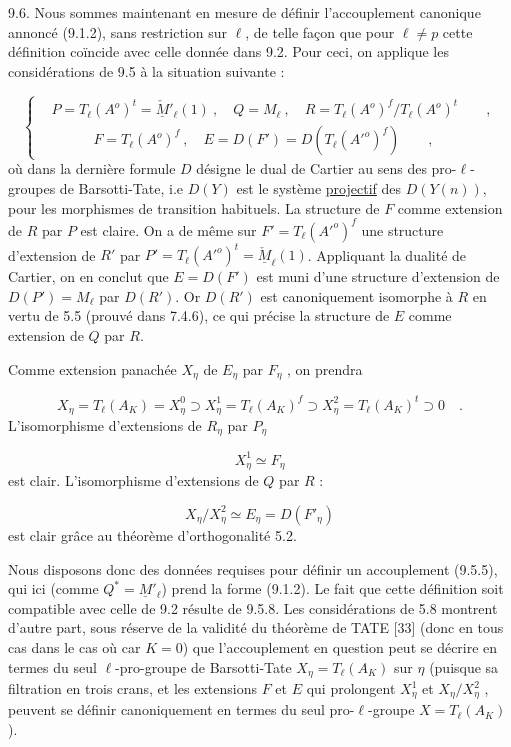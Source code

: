 9.6.  Nous sommes maintenant en mesure de définir l'accouplement canonique annoncé (9.1.2), sans restriction sur $\ell$, de telle façon que pour $\ell \neq p$ cette définition coïncide avec celle donnée dans 9.2. Pour ceci, on applique les considérations de 9.5 à la situation suivante :

\begin{equation}\tag{9.6.1}
\left\{
\begin{aligned}
&P = T_\ell(A^o)^t = \check{\underline{M}}{}'_{\ell}(1) \ , \quad Q = M_\ell \ , \quad R = T_\ell(A^o)^f / T_\ell(A^o)^t \qquad , \\[4ex]
&\qquad\quad F = T_\ell(A^o)^f \ , \quad E = D(F') = D(T_\ell({A'}^o)^f) \qquad ,
\end{aligned}
\right.
\end{equation}
où dans la dernière formule $D$ désigne le dual de Cartier au sens des pro-$\ell$-groupes de Barsotti-Tate, i.e $D(Y)$ est le système \underline{projectif} des $D(Y(n))$, pour les morphismes de transition habituels. La structure de $F$ comme extension de $R$ par $P$ est claire. On a de même sur $F' = T_\ell({A'}^o)^f$ une structure d'extension de $R'$ par $P' = T_\ell({A'}^o)^t = \check{\underline{M}}_\ell(1)$. Appliquant la dualité de Cartier, on en conclut que $E = D(F')$ est muni d'une structure d'extension de $D(P') = M_\ell$ par $D(R')$. Or $D(R')$ est canoniquement isomorphe à $R$ en vertu de 5.5 (prouvé dans 7.4.6), ce qui précise la structure de $E$ comme extension de $Q$ par $R$.



Comme extension panachée $X_\eta$ de $E_\eta$ par $F_\eta$ , on prendra

\begin{equation}\tag{9.6.2}
X_\eta = T_\ell(A_K) = X^0_\eta \supset X^1_\eta = T_\ell(A_K)^f \supset X^2_\eta = T_\ell(A_K)^t \supset 0 \quad .
\end{equation}
L'isomorphisme d'extensions de $R_\eta$ par $P_\eta$

\begin{equation*}
X^1_\eta \simeq F_\eta
\end{equation*}
est clair. L'isomorphisme d'extensions de $Q$ par $R$ :

\begin{equation*}
X_\eta/X^2_\eta \simeq E_\eta = D(F'_\eta)
\end{equation*}
est clair grâce au théorème d'orthogonalité 5.2.

Nous disposons donc des données requises pour définir un accouplement (9.5.5), qui ici (comme $Q^* = \underline{M}'_\ell$) prend la forme (9.1.2). Le fait que cette définition soit compatible avec celle de 9.2 résulte de 9.5.8. Les considérations de 5.8 montrent d'autre part, sous réserve de la validité du théorème de TATE [33] (donc en tous cas dans le cas où car $K = 0$) que l'accouplement en question peut se décrire en termes du seul $\ell$-pro-groupe de Barsotti-Tate $X_\eta = T_\ell(A_K)$ sur $\eta$ (puisque sa filtration en trois crans, et les extensions $F$ et $E$ qui prolongent $X^1_\eta$ et $X_\eta/X^2_\eta$ , peuvent se définir canoniquement en termes du seul pro-$\ell$-groupe $X = T_\ell(A_K)$).

